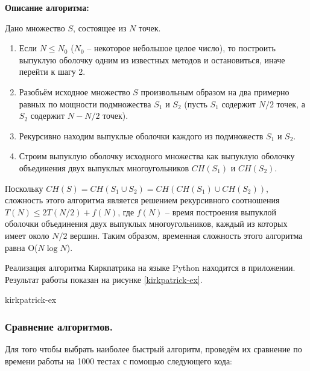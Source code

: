 {\bf Описание алгоритма:}

Дано множество $S$, состоящее из $N$ точек. 
\begin{enumerate}
	\item Если $N \leq N_0$ ($N_0$ -- некоторое небольшое целое число),
то построить выпуклую оболочку одним из известных методов и
остановиться, иначе перейти к шагу 2.
	\item Разобьём исходное множество $S$ произвольным образом на два 
примерно равных по мощности подмножества $S_1$ и $S_2$ (пусть $S_1$
содержит $N/2$ точек, а $S_2$ содержит $N-N/2$ точек).
	\item Рекурсивно находим выпуклые оболочки каждого из подмножеств
$S_1$ и $S_2$.
	\item Строим выпуклую оболочку исходного множества как выпуклую 
оболочку объединения двух выпуклых многоугольников $CH(S_1)$ и
$CH(S_2)$.
\end{enumerate}
Поскольку $CH(S)=CH(S_1 \cup S_2) = CH(CH(S_1)\cup CH(S_2))$,
сложность этого алгоритма является решением рекурсивного соотношения
$T(N)\leq 2T(N/2)+f(N)$, где $f(N)$ -- время построения выпуклой
оболочки объединения двух выпуклых многоугольников, каждый из которых
имеет около $N/2$ вершин. Таким образом, временная сложность
этого алгоритма равна O($N\log{N}$).

Реализация алгоритма Киркпатрика на языке Python находится в
приложении. Результат работы показан на рисунке \ref{kirkpatrick-ex}.

{kirkpatrick-ex}

\subsubsection{Сравнение алгоритмов.}

Для того чтобы выбрать наиболее быстрый алгоритм, проведём их сравнение
по времени работы на 1000 тестах с помощью следующего кода:


